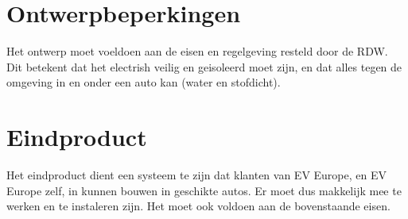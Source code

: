 \section{Ontwerpbeperkingen}

Het ontwerp moet voeldoen aan de eisen en regelgeving resteld door de RDW. Dit
betekent dat het electrish veilig en geisoleerd moet zijn, en dat alles tegen
de omgeving in en onder een auto kan (water en stofdicht).

\section{Eindproduct}

Het eindproduct dient een systeem te zijn dat klanten van EV Europe, en EV
Europe zelf, in kunnen bouwen in geschikte autos. Er moet dus makkelijk mee te
werken en te instaleren zijn. Het moet ook voldoen aan de bovenstaande eisen.
